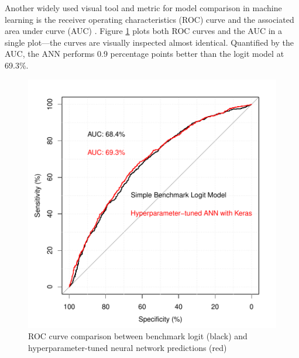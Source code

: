 \documentclass[12pt,a4paper]{article}
\begin{document}
Another widely used visual tool and metric for model comparison in machine learning is the receiver operating characteristics (ROC) curve and the associated
area under curve (AUC) \citep{fawcettIntroductionROCAnalysis2006}.
Figure \ref{fig_roc} plots both ROC curves and the AUC in a single plot---the curves are visually inspected almost identical.
Quantified by the AUC, the ANN performs 0.9 percentage points better than the logit model at 69.3\%.

\begin{figure}[ht]
	\centering
  \includegraphics[scale=0.63]{figures/roc_auc_comp.pdf}
	\caption{ROC curve comparison between benchmark logit (black) and hyperparameter-tuned neural network predictions (red)}
	\label{fig_roc}
\end{figure}
\end{document}
